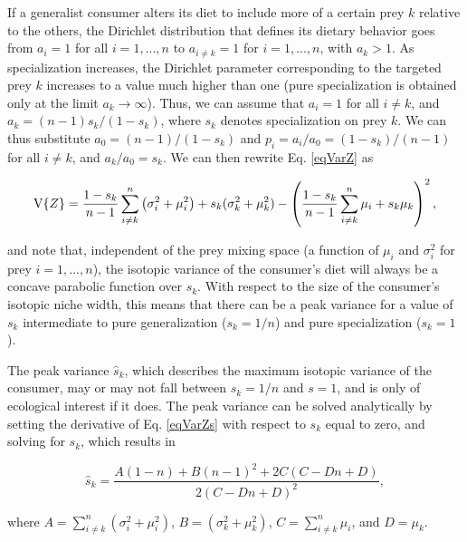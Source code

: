 \documentclass{article}
\begin{document}
If a generalist consumer alters its diet to include more of a certain prey $k$ relative to the others, the Dirichlet distribution that defines its dietary behavior goes from $a_i=1$ for all $i=1,...,n$ to $a_{i \neq k}=1$ for $i=1,...,n$, with $a_k>1$.
As specialization increases, the Dirichlet parameter corresponding to the targeted prey $k$ increases to a value much higher than one (pure specialization is obtained only at the limit $a_k \to \infty$).
Thus, we can assume that $a_i=1$ for all $i \neq k$, and $a_k = (n-1)s_k/(1-s_k)$, where $s_k$ denotes specialization on prey $k$. %
We can thus substitute $a_0 = (n-1)/(1-s_k)$ and $p_i = a_i/a_0 = (1-s_k)/(n-1)$ for all $i \neq k$, and $a_k/a_0 = s_k$.
We can then rewrite Eq. \ref{eqVarZ} as

\begin{equation}
\label{eqVarZs}
{\rm V}\{Z\} = \frac{1-s_k}{n-1}\sum_{i \neq k}^n \left(\sigma_i^2 + \mu_i^2\right) + s_k(\sigma_k^2 + \mu_k^2) - \left(\frac{1-s_k}{n-1}\sum_{i \neq k}^n \mu_i + s_k\mu_k \right)^2,
\end{equation}

\noindent and note that, independent of the prey mixing space (a function of $\mu_i$ and $\sigma_i^2$ for prey $i=1,...,n$), the isotopic variance of the consumer's diet will always be a concave parabolic function over $s_k$.
With respect to the size of the consumer's isotopic niche width, this means that there can be a peak variance for a value of $s_k$ intermediate to pure generalization ($s_k=1/n$) and pure specialization ($s_k=1$).

The peak variance $\hat s_k$, which describes the maximum isotopic variance of the consumer, may or may not fall between $s_k=1/n$ and $s=1$, and is only of ecological interest if it does.
The peak variance can be solved analytically by setting the derivative of Eq. \ref{eqVarZs} with respect to $s_k$ equal to zero, and solving for $s_k$, which results in

\begin{equation}
	\hat s_k = \frac{A(1-n)+B (n-1)^2+2 C (C-D n+D)}{2 (C-D n+D)^2},
\end{equation}

\noindent where $A = \sum_{i \neq k}^n \left(\sigma_i^2 + \mu_i^2\right)$, $B = \left(\sigma_k^2 + \mu_k^2\right)$, $C = \sum_{i \neq k}^n \mu_i$, and $D = \mu_k$.
\end{document}
